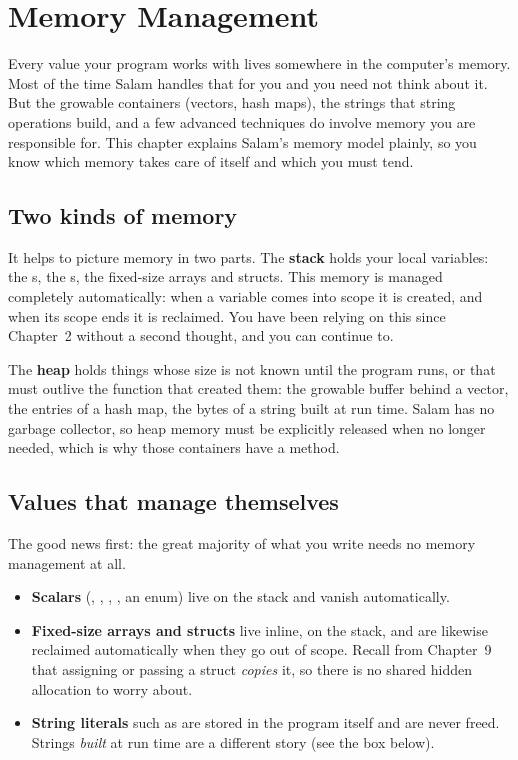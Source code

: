 \chapter{Memory Management}%
\label{ch:memory}

Every value your program works with lives somewhere in the computer's memory.
Most of the time Salam handles that for you and you need not think about it. But
the growable containers (vectors, hash maps), the strings that string operations
build, and a few advanced techniques do involve memory you are responsible for.
This chapter explains Salam's memory model plainly, so you know which memory takes care of itself and which you must tend.

\section{Two kinds of memory}

It helps to picture memory in two parts. The \textbf{stack} holds your local
variables: the s, the s, the fixed-size arrays and structs.
This memory is managed completely automatically: when a variable comes into scope
it is created, and when its scope ends it is reclaimed. You have been relying on
this since Chapter~2 without a second thought, and you can continue to.

The \textbf{heap} holds things whose size is not known until the program runs, or
that must outlive the function that created them: the growable buffer behind a
vector, the entries of a hash map, the bytes of a string built at run time. Salam
has no garbage collector, so heap memory must be explicitly released when no
longer needed, which is why those containers have a  method.

\section{Values that manage themselves}

The good news first: the great majority of what you write needs no memory
management at all.

\begin{itemize}[leftmargin=1.4em]
  \item \textbf{Scalars} (, , , , an
        enum) live on the stack and vanish automatically.
  \item \textbf{Fixed-size arrays and structs} live inline, on the stack, and are
        likewise reclaimed automatically when they go out of scope. Recall from
        Chapter~9 that assigning or passing a struct \emph{copies} it, so there is
        no shared hidden allocation to worry about.
  \item \textbf{String literals} such as  are stored in the program
        itself and are never freed. Strings \emph{built} at run time are a
        different story (see the box below).
\end{itemize}

